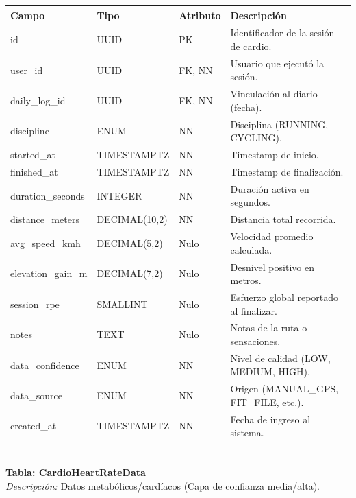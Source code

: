 \documentclass[12pt]{article}
\begin{document}
\begin{table}[h!]
    \centering
    \renewcommand{\arraystretch}{1.2}
    \small
    \begin{tabular}{|p{3.5cm}|p{2.7cm}|p{2cm}|p{6.5cm}|}
        \hline
        \rowcolor[HTML]{EFEFEF}
        \textbf{Campo} & \textbf{Tipo} & \textbf{Atributo} & \textbf{Descripción} \\ \hline
        id & UUID & PK & Identificador de la sesión de cardio. \\ \hline
        user\_id & UUID & FK, NN & Usuario que ejecutó la sesión. \\ \hline
        daily\_log\_id & UUID & FK, NN & Vinculación al diario (fecha). \\ \hline
        discipline & ENUM & NN & Disciplina (RUNNING, CYCLING). \\ \hline
        started\_at & TIMESTAMPTZ & NN & Timestamp de inicio. \\ \hline
        finished\_at & TIMESTAMPTZ & NN & Timestamp de finalización. \\ \hline
        duration\_seconds & INTEGER & NN & Duración activa en segundos. \\ \hline
        distance\_meters & DECIMAL(10,2) & NN & Distancia total recorrida. \\ \hline
        avg\_speed\_kmh & DECIMAL(5,2) & Nulo & Velocidad promedio calculada. \\ \hline
        elevation\_gain\_m & DECIMAL(7,2) & Nulo & Desnivel positivo en metros. \\ \hline
        session\_rpe & SMALLINT & Nulo & Esfuerzo global reportado al finalizar. \\ \hline
        notes & TEXT & Nulo & Notas de la ruta o sensaciones. \\ \hline
        data\_confidence & ENUM & NN & Nivel de calidad (LOW, MEDIUM, HIGH). \\ \hline
        data\_source & ENUM & NN & Origen (MANUAL\_GPS, FIT\_FILE, etc.). \\ \hline
        created\_at & TIMESTAMPTZ & NN & Fecha de ingreso al sistema. \\ \hline
    \end{tabular}
\end{table}
\\
\noindent\textbf{Tabla: CardioHeartRateData} \\
\textit{Descripción:} Datos metabólicos/cardíacos (Capa de confianza media/alta).
\end{document}
